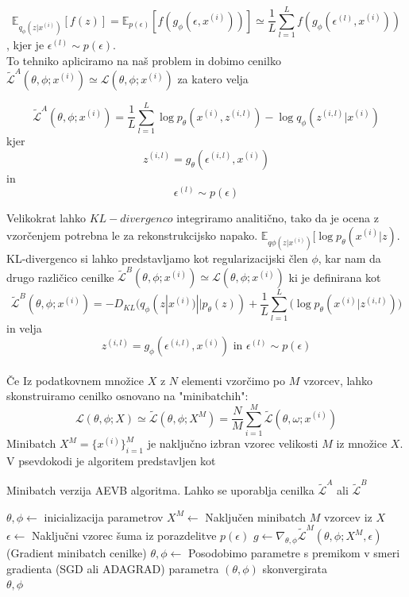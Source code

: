 \documentclass[12pt,a4paper,twoside]{article}
\theoremstyle{definition} %
\theoremstyle{plain} %
\numberwithin{equation}{section}  %
\begin{document}
$$ \mathbb{E}_{q_\phi(z|x^{(i)})}[f(z)] = \mathbb{E}_{p(\epsilon)}[f(g_\phi(\epsilon,x^{(i)}))] \simeq \frac{1}{L}\sum_{l=1}^{L}f(g_\phi(\epsilon^{(l)},x^{(i)})) $$
, kjer je $\epsilon^{(l)} \sim p(\epsilon)$. \\
To tehniko apliciramo na naš problem in dobimo cenilko $\tilde{\mathcal{L}}^A(\theta,\phi;x^{(i)}) \simeq \mathcal{L}(\theta,\phi;x^{(i)})$  za katero velja 

$$  \tilde{\mathcal{L}}^A(\theta,\phi;x^{(i)}) = \frac{1}{L} \sum_{l=1}^L \log{p_\theta (x^({i}),z^{(i,l)})}-\log{q_\phi (z^{(i,l)}|x^{(i)})} $$ kjer $$z^{(i,l)} = g_\theta(\epsilon^{(i,l)},x^{(i)})$$ in $$\epsilon^{(l)} \sim p(\epsilon)$$

Velikokrat lahko $KL-divergenco$ integriramo analitično, tako da je ocena z vzorčenjem potrebna le za rekonstrukcijsko napako. $\mathbb{E}_{q\phi(z|x^{(i)})}[\log{p_\theta(x^{(i)}|z)}$. KL-divergenco si lahko predstavljamo kot regularizacijski člen $\phi$, kar nam 
da drugo različico cenilke $ \widetilde{\mathcal{L}}^B(\theta,\phi;x^{(i)}) \simeq \mathcal{L}(\theta,\phi;x^{(i)}) $ ki je definirana kot 
 $$ \widetilde{\mathcal{L}}^B(\theta,\phi;x^{(i)}) = - D_{KL}(q_\phi(z|x^{(i)})||p_\theta(z)) + \frac{1}{L}\sum_{l=1}^L(\log{p_\theta(x^{(i)}|z^{(i,l)}))} $$ 
in velja $$ z^{(i,l)} = g_\phi(\epsilon^{(i,l)},x^{(i)}) \text{ in }  \epsilon^{(l)} \sim p(\epsilon)$$
\\
Če Iz podatkovnem množice $X$ z $N$ elementi vzorčimo po $M$ vzorcev, lahko skonstruiramo cenilko osnovano na "minibatchih": 
 $$ \mathcal{L}(\theta,\phi;X) \simeq \widetilde{\mathcal{L}}(\theta,\phi;X^M) = \frac{N}{M}\sum_{i=1}^M \widetilde{\mathcal{L}}(\theta,\omega;x^{(i)}) $$ 
Minibatch $X^M = \{ x^{(i)} \}_{i=1}^M$ je naključno izbran vzorec velikosti $M$ iz množice $X$.
V psevdokodi je  algoritem predstavljen kot 
\begin{algorithm}
\caption{Minibatch verzija AEVB algoritma. Lahko se uporablja cenilka $\widetilde{\mathcal{L}}^A$ ali $\widetilde{\mathcal{L}}^B$ }\label{minibatch-aevb}
\begin{algorithmic}[1]
\State $\theta,\phi \leftarrow$  inicializacija parametrov
\Repeat 
	\State $X^M \leftarrow$ Naključen minibatch $M$ vzorcev iz $X$
	\State $\epsilon \leftarrow$ Naključni vzorec šuma iz porazdelitve $p(\epsilon)$
	\State $g \leftarrow \nabla_{\theta,\phi}\widetilde{\mathcal{L}}^M(\theta,\phi;X^M,\epsilon)$ (Gradient minibatch cenilke)
	\State $\theta,\phi \leftarrow$ Posodobimo parametre s premikom v smeri gradienta (SGD ali ADAGRAD)	  
\Until parametra $(\theta,\phi)$ skonvergirata \\
\Return $\theta,\phi$
\end{algorithmic}
\end{algorithm}
\end{document}
